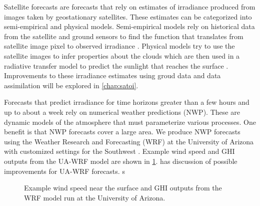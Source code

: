 Satellite forecasts are forecasts that rely on estimates of irradiance
produced from images taken by geostationary satellites.
These estimates can be categorized into semi-empirical and physical models.
Semi-empirical models rely on historical data from the satellite and
ground sensors to find the function that translates from satellite
image pixel to observed irradiance \citep{Perez2013a}.
Physical models try to use the satellite images to infer properties
about the clouds which are then used in a radiative transfer model to
predict the sunlight that reaches the surface \citep{Miller2013}.
Improvements to these irradiance estimates using groud data and data
assimilation will be explored in \cref{chap:satoi}.

Forecasts that predict irradiance for time horizons greater than a few
hours and up to about a week rely on numerical weather predictions
(NWP).
These are dynamic models of the atmosphere that must parameterize
various processes.
One benefit is that NWP forecasts cover a large area.
We produce NWP forecasts using the Weather Research and Forecasting
(WRF) \citep{Skamarock2008} at the University of Arizona with customized
settings for the Southwest \citep{Leuthold}.
Example wind speed and GHI outputs from the UA-WRF model are shown in
\cref{fig:wrf}.
 has discussion of possible improvements for
UA-WRF forecasts.
s
\begin{figure}[h]
\hspace{-.5em}
\caption[Wind speed and GHI output from UA-WRF]{Example wind speed
  near the surface and GHI outputs from the WRF model run at the
  University of Arizona.}
\label{fig:wrf}
\end{figure}

